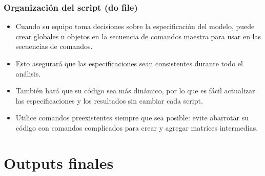 \documentclass[10pt, aspectratio=169, compress]{beamer}
\begin{document}
\begin{frame}[t]
	\frametitle{Organización del script (do file)}
	\begin{itemize}[<+->]
		\item Cuando su equipo toma decisiones sobre la especificación del modelo, puede crear globales u objetos en la secuencia de comandos maestra para usar en las secuencias de comandos.
		\item Esto asegurará que las especificaciones sean consistentes durante todo el análisis.
		\item También hará que su código sea más dinámico, por lo que es fácil actualizar las especificaciones y los resultados sin cambiar cada script.
		\item Utilice comandos preexistentes siempre que sea posible: evite abarrotar su código con comandos complicados para crear y agregar matrices intermedias.
	\end{itemize}
\end{frame}
\section{Outputs finales}
\end{document}
